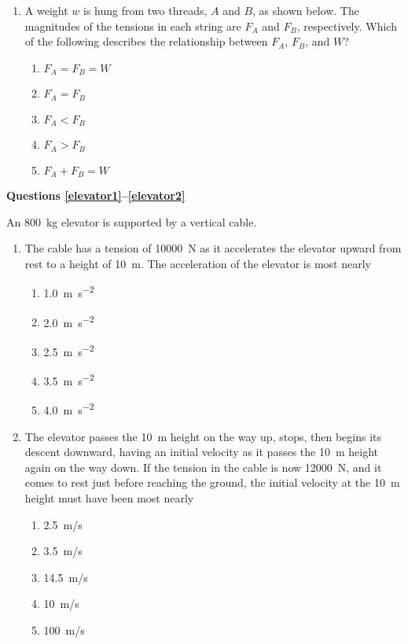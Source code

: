\documentclass{../../oss-apphys}
\begin{document}
\begin{multicols}{2}
\begin{enumerate}[resume,leftmargin=18pt]
  \item A weight $w$ is hung from two threads, $A$ and $B$, as shown below. The
    magnitudes of the tensions in each string are $F_A$ and $F_B$, respectively.
    Which of the following describes the relationship between $F_A$, $F_B$, and
    $W$?
    \begin{center}
    \end{center}
    \begin{enumerate}[noitemsep,topsep=0pt,leftmargin=18pt,label=(\Alph*)]
    \item $F_A=F_B=W$
    \item $F_A=F_B$
    \item $F_A<F_B$
    \item $F_A>F_B$
    \item $F_A+F_B=W$
    \end{enumerate}
  \end{enumerate}
  \columnbreak
  
  \textbf{Questions \ref{elevator1}--\ref{elevator2}}

  An \SI{800}{\kilo\gram} elevator is supported by a vertical cable.
  \begin{enumerate}[resume,leftmargin=18pt]
  \item The cable has a tension of \SI{10000}{\newton} as it accelerates the
    elevator upward from rest to a height of \SI{10}{\metre}. The acceleration
    of the elevator is most nearly
    \begin{enumerate}[noitemsep,topsep=0pt,leftmargin=18pt,label=(\Alph*)]
    \item\SI{1.0}{\metre\per\second^2}
    \item\SI{2.0}{\metre\per\second^2}
    \item\SI{2.5}{\metre\per\second^2}
    \item\SI{3.5}{\metre\per\second^2}
    \item\SI{4.0}{\metre\per\second^2}
    \end{enumerate}
    \label{elevator1}
    
  \item The elevator passes the \SI{10}{\metre} height on the way up, stops,
    then begins its descent downward, having an initial velocity as it passes
    the \SI{10}{\metre} height again on the way down. If the tension in the
    cable is now \SI{12000}{\newton}, and it comes to rest just before reaching
    the ground, the initial velocity at the \SI{10}{\metre} height must have
    been most nearly
    \begin{enumerate}[noitemsep,topsep=0pt,leftmargin=18pt,label=(\Alph*)]
    \item\SI{2.5}{m/s}
    \item\SI{3.5}{m/s}
    \item\SI{14.5}{m/s}
    \item\SI{10}{m/s}
    \item\SI{100}{m/s}
    \end{enumerate}
    \label{elevator2}


\end{enumerate}
\end{multicols}
\end{document}
